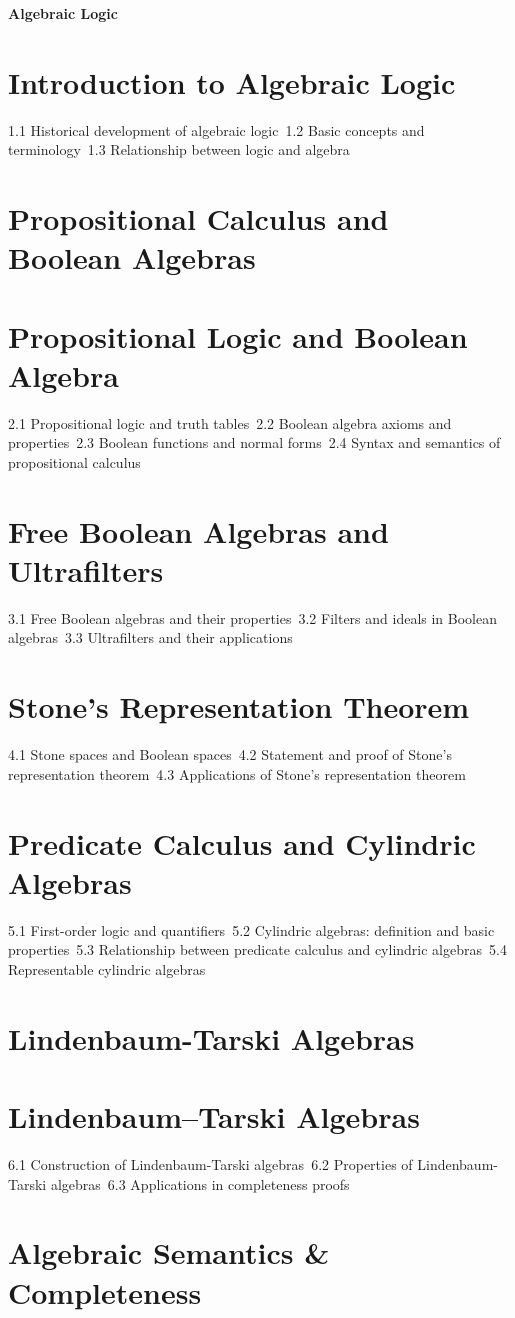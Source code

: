 {\LARGE \bf{Algebraic Logic}}
\section{Introduction to Algebraic Logic}
1.1 Historical development of algebraic logic\
1.2 Basic concepts and terminology\
1.3 Relationship between logic and algebra\
\section{Propositional Calculus and Boolean Algebras}
\section{Propositional Logic and Boolean Algebra}
2.1 Propositional logic and truth tables\
2.2 Boolean algebra axioms and properties\
2.3 Boolean functions and normal forms\
2.4 Syntax and semantics of propositional calculus\
\section{Free Boolean Algebras and Ultrafilters}
3.1 Free Boolean algebras and their properties\
3.2 Filters and ideals in Boolean algebras\
3.3 Ultrafilters and their applications\
\section{Stone's Representation Theorem}
4.1 Stone spaces and Boolean spaces\
4.2 Statement and proof of Stone's representation theorem\
4.3 Applications of Stone's representation theorem\
\section{Predicate Calculus and Cylindric Algebras}
5.1 First-order logic and quantifiers\
5.2 Cylindric algebras: definition and basic properties\
5.3 Relationship between predicate calculus and cylindric algebras\
5.4 Representable cylindric algebras\
\section{Lindenbaum-Tarski Algebras}
\section{Lindenbaum–Tarski Algebras}
6.1 Construction of Lindenbaum-Tarski algebras\
6.2 Properties of Lindenbaum-Tarski algebras\
6.3 Applications in completeness proofs\
\section{Algebraic Semantics \& Completeness}
